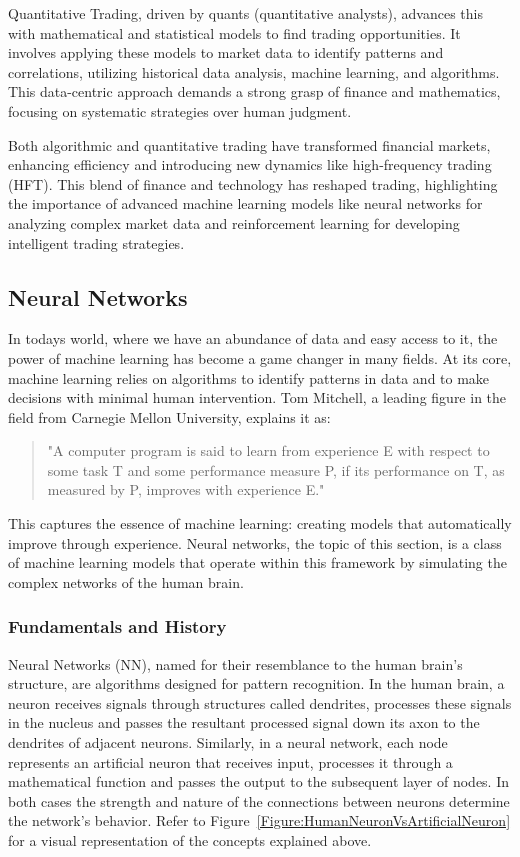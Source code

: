 Quantitative Trading, driven by quants (quantitative analysts), advances this with mathematical and statistical models to find trading opportunities. It involves applying these models to market data to identify patterns and correlations, utilizing historical data analysis, machine learning, and algorithms. This data-centric approach demands a strong grasp of finance and mathematics, focusing on systematic strategies over human judgment.

Both algorithmic and quantitative trading have transformed financial markets, enhancing efficiency and introducing new dynamics like high-frequency trading (HFT). This blend of finance and technology has reshaped trading, highlighting the importance of advanced machine learning models like neural networks for analyzing complex market data and reinforcement learning for developing intelligent trading strategies.

\subsection{Neural Networks}

In todays world, where we have an abundance of data and easy access to it, the power of machine learning has become a game changer in  many fields. At its core, machine learning relies on algorithms to identify patterns in data and to make decisions with minimal human intervention. Tom Mitchell, a leading figure in the field from Carnegie Mellon University, explains it as:
\begin{quote}
"A computer program is said to learn from experience E with respect to some task T and some performance measure P, if its performance on T, as measured by P, improves with experience E."
\end{quote}
This captures the essence of machine learning: creating models that automatically improve through experience. Neural networks, the topic of this section, is a class of machine learning models that operate within this framework by simulating the complex networks of the human brain.

\subsubsection{Fundamentals and History}
Neural Networks (NN), named for their resemblance to the human brain's structure, are algorithms designed for pattern recognition. In the human brain, a neuron receives signals through structures called dendrites, processes these signals in the nucleus and passes the resultant processed signal down its axon to the dendrites of adjacent neurons. Similarly, in a neural network, each node represents an artificial neuron that receives input, processes it through a mathematical function and passes the output to the subsequent layer of nodes. In both cases the strength and nature of the connections between neurons determine the network's behavior. Refer to Figure~\ref{Figure:HumanNeuronVsArtificialNeuron} for a visual representation of the concepts explained above.

